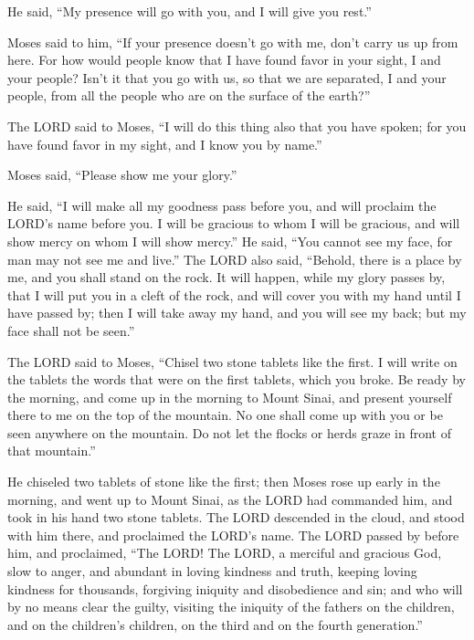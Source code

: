 \myverse{}He said, “My presence will go with you, and I will give you
rest.”


\myverse{}Moses said to him, “If your presence doesn’t go with me, don’t
carry us up from here.
\myverse{}For how would people know that I have found favor in your sight, I and your
people? Isn’t it that you go with us, so that we are separated, I and your people, from all the people
who are on the surface of the earth?”


\myverse{}The LORD said to Moses, “I will do this thing also that you
have spoken; for you have found favor in my sight, and I know you by name.”


\myverse{}Moses said, “Please show me your glory.”


\myverse{}He said, “I will make all my goodness pass before you, and will
proclaim the LORD’s name before you. I will be gracious to whom I will be gracious, and will show mercy
on whom I will show mercy.”
\myverse{}He said, “You cannot see my face, for man may not see me and live.”
\myverse{}The LORD also said, “Behold, there is a place by me, and you shall stand
on the rock.
\myverse{}It will happen, while my glory passes by, that I will put you in a cleft
of the rock, and will cover you with my hand until I have passed by;
\myverse{}then I will take away my hand, and you will see my back; but my face shall
not be seen.”


\mychapter{} \myverse*{}The LORD said to Moses, “Chisel two stone tablets like the first.
I will write on the tablets the words that were on the first tablets, which you broke.
\myverse{}Be ready by the morning, and come up in the morning to Mount Sinai, and present
yourself there to me on the top of the mountain.
\myverse{}No one shall come up with you or be seen anywhere on the mountain. Do not let
the flocks or herds graze in front of that mountain.”


\myverse{}He chiseled two tablets of stone like the first; then Moses rose
up early in the morning, and went up to Mount Sinai, as the LORD had commanded him, and took in his hand
two stone tablets.
\myverse{}The LORD descended in the cloud, and stood with him there, and proclaimed the
LORD’s name.
\myverse{}The LORD passed by before him, and proclaimed, “The LORD! The LORD, a merciful
and gracious God, slow to anger, and abundant in loving kindness and truth,
\myverse{}keeping loving kindness for thousands, forgiving iniquity and disobedience
and sin; and who will by no means clear the guilty, visiting the iniquity of the fathers on the children,
and on the children’s children, on the third and on the fourth generation.”



